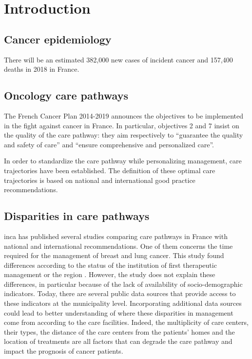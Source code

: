 \chapter{Introduction}



\section{Cancer epidemiology}

There will be an estimated 382,000 new cases of incident cancer and 157,400
deaths in 2018 in France.


\section{Oncology care pathways}

The French Cancer Plan \cite{buzyn_plan_2014} 2014-2019 announces the objectives
to be implemented in the fight against cancer in France. In particular,
objectives 2 and 7 insist on the quality of the care pathway: they aim
respectively to ``guarantee the quality and safety of care'' and ``ensure
comprehensive and personalized care''.

In order to standardize the care pathway while personalizing management, care
trajectories have been established. The definition of these optimal care
trajectories is based on national and international good practice
recommendations.



\section{Disparities in care pathways}

\ac{inca} has published several studies comparing care pathways in France with
national and international recommendations. One of them concerns the time
required for the management of breast and lung cancer. This study found
differences according to the status of the institution of first therapeutic
management or the region \cite{bernard_ledesert_etude_2012}. However, the study
does not explain these differences, in particular because of the lack of
availability of socio-demographic indicators. Today, there are several public
data sources that provide access to these indicators at the municipality level.
Incorporating additional data sources could lead to better understanding of
where these disparities in management come from according to the care
facilities. Indeed, the multiplicity of care centers, their types, the distance
of the care centers from the patients' homes and the location of treatments are
all factors that can degrade the care pathway and impact the prognosis of cancer
patients.

